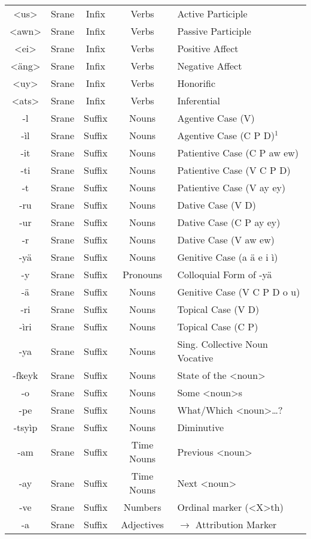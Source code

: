 \begin{center}
\begin{longtable}[c]{|c c c c l|}
{<us>} & Srane & Infix & Verbs & Active Participle\\
{<awn>} & Srane & Infix & Verbs & Passive Participle\\
{<ei>} & Srane & Infix & Verbs & Positive Affect\\
{<äng>} & Srane & Infix & Verbs & Negative Affect\\
{<uy>} & Srane & Infix & Verbs & Honorific\\
{<ats>} & Srane & Infix & Verbs & Inferential\\
{-l} & Srane & Suffix & Nouns & Agentive Case (V)\\
{-ìl} & Srane & Suffix & Nouns & Agentive Case (C P D)$^1$\\
{-it} & Srane & Suffix & Nouns & Patientive Case (C P aw ew)\\
{-ti} & Srane & Suffix & Nouns & Patientive Case (V C P D)\\
{-t} & Srane & Suffix & Nouns & Patientive Case (V ay ey)\\
{-ru} & Srane & Suffix & Nouns & Dative Case (V D)\\
{-ur} & Srane & Suffix & Nouns & Dative Case (C P ay ey)\\
{-r} & Srane & Suffix & Nouns & Dative Case (V aw ew)\\
{-yä} & Srane & Suffix & Nouns & Genitive Case (a ä e i ì)\\
{-y} & Srane & Suffix & Pronouns & Colloquial Form of -yä\\
{-ä} & Srane & Suffix & Nouns & Genitive Case (V C P D o u)\\
{-ri} & Srane & Suffix & Nouns & Topical Case (V D)\\
{-ìri} & Srane & Suffix & Nouns & Topical Case (C P)\\
{-ya} & Srane & Suffix & Nouns & Sing. Collective Noun Vocative\\
{-fkeyk} & Srane & Suffix & Nouns & State of the <noun>\\
{-o} & Srane & Suffix & Nouns & Some <noun>s\\
{-pe} & Srane & Suffix & Nouns & What/Which <noun>\ldots ?\\
{-tsyìp} & Srane & Suffix & Nouns & Diminutive\\
{-am} & Srane & Suffix & Time Nouns & Previous <noun>\\
{-ay} & Srane & Suffix & Time Nouns & Next <noun>\\
{-ve} & Srane & Suffix & Numbers & Ordinal marker (<X>th)\\
{-a} & Srane & Suffix & Adjectives & $\rightarrow$ Attribution Marker\\

\end{longtable}
\end{center}
